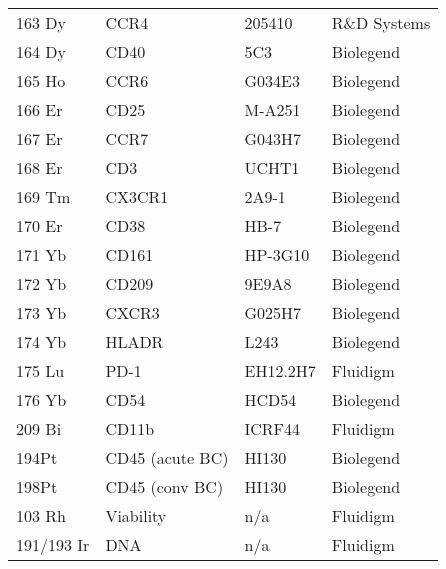 \begin{flushleft}
\begin{longtable}[c]{l l l l}
    163 Dy & CCR4 & 205410 & R\&D Systems \\
    164 Dy & CD40 & 5C3 & Biolegend \\
    165 Ho & CCR6 & G034E3 & Biolegend \\
    166 Er & CD25 & M-A251 & Biolegend \\
    167 Er & CCR7 & G043H7 & Biolegend \\
    168 Er & CD3 & UCHT1 & Biolegend \\
    169 Tm & CX3CR1 & 2A9-1 & Biolegend \\
    170 Er & CD38 & HB-7 & Biolegend \\
    171 Yb & CD161 & HP-3G10 & Biolegend \\
    172 Yb & CD209 & 9E9A8 & Biolegend \\
    173 Yb & CXCR3 & G025H7 & Biolegend \\
    174 Yb & HLADR & L243 & Biolegend \\
    175 Lu & PD-1 & EH12.2H7 & Fluidigm \\
    176 Yb & CD54 & HCD54 & Biolegend \\
    209 Bi & CD11b & ICRF44 & Fluidigm \\
    194Pt & CD45 (acute BC) & HI130 & Biolegend \\
    198Pt  & CD45 (conv BC) & HI130 & Biolegend \\
    103 Rh  & Viability & n/a & Fluidigm \\
    191/193 Ir & DNA & n/a & Fluidigm
    \label{tab:chik_antibodies}
\end{longtable}

\end{flushleft}

\restoregeometry
\tuftefancyhfoffset

\clearpage
\newpage

